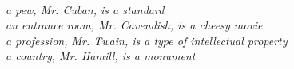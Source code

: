 \leavevmode \\
\begin{center}
    \begin{minipage}{0.6\textwidth}
        \textit{%
            a pew, Mr. Cuban, is a standard \\
            an entrance room, Mr. Cavendish, is a cheesy movie \\
            a profession, Mr. Twain, is a type of intellectual property \\
            a country, Mr. Hamill, is a monument}%
    \end{minipage}
\end{center}
